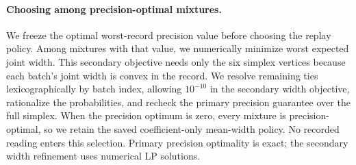 \paragraph{Choosing among precision-optimal mixtures.}
We freeze the optimal worst-record precision value before choosing the
replay policy. Among mixtures with that value, we numerically minimize
worst expected joint width. This secondary objective needs only the six
simplex vertices because each batch's joint width is convex in the record.
We resolve remaining ties lexicographically by batch index, allowing
$10^{-10}$ in the secondary width objective, rationalize the probabilities,
and recheck the primary precision guarantee over the full simplex.
When the precision optimum is zero, every mixture is precision-optimal,
so we retain the saved coefficient-only mean-width policy. No recorded
reading enters this selection. Primary precision optimality is exact;
the secondary width refinement uses numerical LP solutions.

